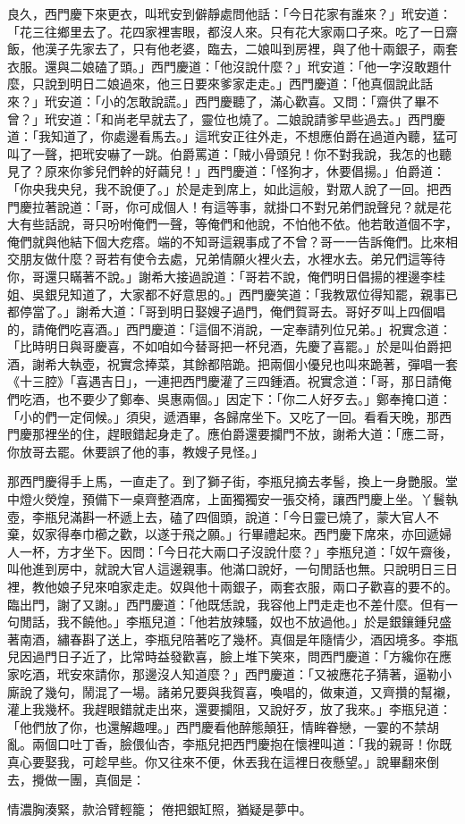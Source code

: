 良久，西門慶下來更衣，叫玳安到僻靜處問他話：「今日花家有誰來？」玳安道：「花三往鄉里去了。花四家裡害眼，都沒人來。只有花大家兩口子來。吃了一日齋飯，他漢子先家去了，只有他老婆，臨去，二娘叫到房裡，與了他十兩銀子，兩套衣服。還與二娘磕了頭。」西門慶道：「他沒說什麼？」玳安道：「他一字沒敢題什麼，只說到明日二娘過來，他三日要來爹家走走。」西門慶道：「他真個說此話來？」玳安道：「小的怎敢說謊。」西門慶聽了，滿心歡喜。又問：「齋供了畢不曾？」玳安道：「和尚老早就去了，靈位也燒了。二娘說請爹早些過去。」西門慶道：「我知道了，你處邊看馬去。」這玳安正往外走，不想應伯爵在過道內聽，猛可叫了一聲，把玳安嚇了一跳。伯爵罵道：「賊小骨頭兒！你不對我說，我怎的也聽見了？原來你爹兒們幹的好繭兒！」西門慶道：「怪狗才，休要倡揚。」伯爵道：「你央我央兒，我不說便了。」於是走到席上，如此這般，對眾人說了一回。把西門慶拉著說道：「哥，你可成個人！有這等事，就掛口不對兄弟們說聲兒？就是花大有些話說，哥只吩咐俺們一聲，等俺們和他說，不怕他不依。他若敢道個不字，俺們就與他結下個大疙瘩。端的不知哥這親事成了不曾？哥一一告訴俺們。比來相交朋友做什麼？哥若有使令去處，兄弟情願火裡火去，水裡水去。弟兄們這等待你，哥還只瞞著不說。」謝希大接過說道：「哥若不說，俺們明日倡揚的裡邊李桂姐、吳銀兒知道了，大家都不好意思的。」西門慶笑道：「我教眾位得知罷，親事已都停當了。」謝希大道：「哥到明日娶嫂子過門，俺們賀哥去。哥好歹叫上四個唱的，請俺們吃喜酒。」西門慶道：「這個不消說，一定奉請列位兄弟。」祝實念道：「比時明日與哥慶喜，不如咱如今替哥把一杯兒酒，先慶了喜罷。」於是叫伯爵把酒，謝希大執壺，祝實念捧菜，其餘都陪跪。把兩個小優兒也叫來跪著，彈唱一套《十三腔》「喜遇吉日」，一連把西門慶灌了三四鍾酒。祝實念道：「哥，那日請俺們吃酒，也不要少了鄭奉、吳惠兩個。」因定下：「你二人好歹去。」鄭奉掩口道：「小的們一定伺候。」須臾，遞酒畢，各歸席坐下。又吃了一回。看看天晚，那西門慶那裡坐的住，趕眼錯起身走了。應伯爵還要攔門不放，謝希大道：「應二哥，你放哥去罷。休要誤了他的事，教嫂子見怪。」

那西門慶得手上馬，一直走了。到了獅子街，李瓶兒摘去孝髻，換上一身艷服。堂中燈火熒煌，預備下一桌齊整酒席，上面獨獨安一張交椅，讓西門慶上坐。丫鬟執壺，李瓶兒滿斟一杯遞上去，磕了四個頭，說道：「今日靈已燒了，蒙大官人不棄，奴家得奉巾櫛之歡，以遂于飛之願。」行畢禮起來。西門慶下席來，亦回遞婦人一杯，方才坐下。因問：「今日花大兩口子沒說什麼？」李瓶兒道：「奴午齋後，叫他進到房中，就說大官人這邊親事。他滿口說好，一句閒話也無。只說明日三日裡，教他娘子兒來咱家走走。奴與他十兩銀子，兩套衣服，兩口子歡喜的要不的。臨出門，謝了又謝。」西門慶道：「他既恁說，我容他上門走走也不差什麼。但有一句閒話，我不饒他。」李瓶兒道：「他若放辣騷，奴也不放過他。」於是銀鑲鍾兒盛著南酒，繡春斟了送上，李瓶兒陪著吃了幾杯。真個是年隨情少，酒因境多。李瓶兒因過門日子近了，比常時益發歡喜，臉上堆下笑來，問西門慶道：「方纔你在應家吃酒，玳安來請你，那邊沒人知道麼？」西門慶道：「又被應花子猜著，逼勒小廝說了幾句，鬧混了一場。諸弟兄要與我賀喜，喚唱的，做東道，又齊攢的幫襯，灌上我幾杯。我趕眼錯就走出來，還要攔阻，又說好歹，放了我來。」李瓶兒道：「他們放了你，也還解趣哩。」西門慶看他醉態顛狂，情眸眷戀，一霎的不禁胡亂。兩個口吐丁香，臉偎仙杏，李瓶兒把西門慶抱在懷裡叫道：「我的親哥！你既真心要娶我，可趁早些。你又往來不便，休丟我在這裡日夜懸望。」說畢翻來倒去，攪做一團，真個是：

情濃胸湊緊，款洽臂輕籠；
倦把銀缸照，猶疑是夢中。

